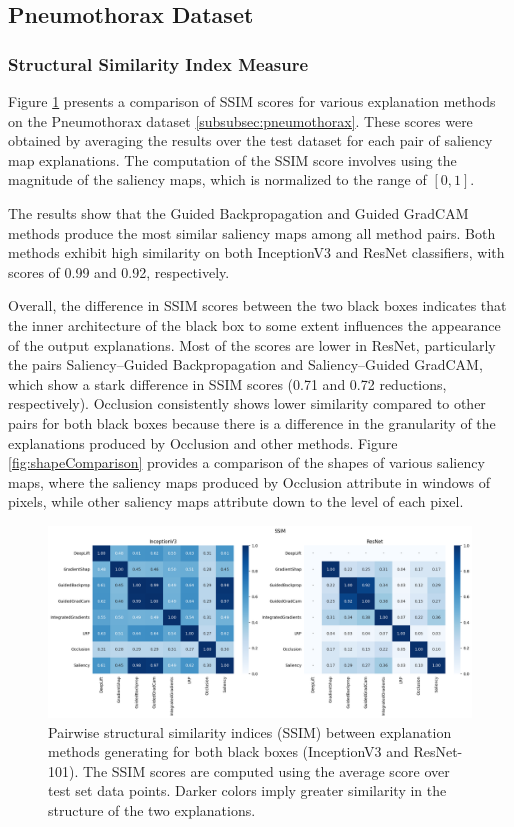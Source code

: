 
\subsection{Pneumothorax Dataset}
\label{subsec:resultPneumothorax}
\subsubsection{Structural Similarity Index Measure}
\label{subsec:ssim}
Figure \ref{fig:ssim} presents a comparison of SSIM scores for various explanation methods on the Pneumothorax dataset \ref{subsubsec:pneumothorax}. These scores were obtained by averaging the results over the test dataset for each pair of saliency map explanations. The computation of the SSIM score involves using the magnitude of the saliency maps, which is normalized to the range of $[0, 1]$.

The results show that the Guided Backpropagation and Guided GradCAM methods produce the most similar saliency maps among all method pairs. Both methods exhibit high similarity on both InceptionV3 and ResNet classifiers, with scores of 0.99 and 0.92, respectively.

Overall, the difference in SSIM scores between the two black boxes indicates that the inner architecture of the black box to some extent influences the appearance of the output explanations. Most of the scores are lower in ResNet, particularly the pairs Saliency--Guided Backpropagation and Saliency--Guided GradCAM, which show a stark difference in SSIM scores (0.71 and 0.72 reductions, respectively). Occlusion consistently shows lower similarity compared to other pairs for both black boxes because there is a difference in the granularity of the explanations produced by Occlusion and other methods. Figure \ref{fig:shapeComparison} provides a comparison of the shapes of various saliency maps, where the saliency maps produced by Occlusion attribute in windows of pixels, while other saliency maps attribute down to the level of each pixel.

\begin{figure}[t]
    \centering
    \includegraphics[width=\textwidth]{images/results/pneumothorax/ssim.png}
    \caption{Pairwise structural similarity indices (SSIM) between explanation methods generating for both black boxes (InceptionV3 and ResNet-101). The SSIM scores are computed using the average score over test set data points. Darker colors imply greater similarity in the structure of the two explanations.}
    \label{fig:ssim}
\end{figure}

